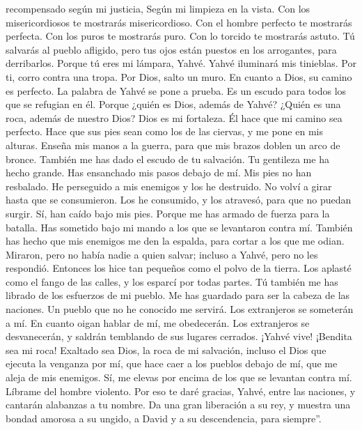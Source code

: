 recompensado según mi justicia, Según mi limpieza en la vista.
 Con los misericordiosos te mostrarás misericordioso. Con
el hombre perfecto te mostrarás perfecta.  Con los puros
te mostrarás puro. Con lo torcido te mostrarás astuto. 
Tú salvarás al pueblo afligido, pero tus ojos están puestos en los
arrogantes, para derribarlos.  Porque tú eres mi lámpara,
Yahvé. Yahvé iluminará mis tinieblas.  Por ti, corro
contra una tropa. Por Dios, salto un muro.  En cuanto a
Dios, su camino es perfecto. La palabra de Yahvé se pone a prueba. Es un
escudo para todos los que se refugian en él.  Porque
¿quién es Dios, además de Yahvé? ¿Quién es una roca, además de nuestro
Dios?  Dios es mi fortaleza. Él hace que mi camino sea
perfecto.  Hace que sus pies sean como los de las
ciervas, y me pone en mis alturas.  Enseña mis manos a la
guerra, para que mis brazos doblen un arco de bronce. 
También me has dado el escudo de tu salvación. Tu gentileza me ha hecho
grande.  Has ensanchado mis pasos debajo de mí. Mis pies
no han resbalado.  He perseguido a mis enemigos y los he
destruido. No volví a girar hasta que se consumieron. 
Los he consumido, y los atravesó, para que no puedan surgir. Sí, han
caído bajo mis pies.  Porque me has armado de fuerza para
la batalla. Has sometido bajo mi mando a los que se levantaron contra
mí.  También has hecho que mis enemigos me den la
espalda, para cortar a los que me odian.  Miraron, pero
no había nadie a quien salvar; incluso a Yahvé, pero no les respondió.
 Entonces los hice tan pequeños como el polvo de la
tierra. Los aplasté como el fango de las calles, y los esparcí por todas
partes.  Tú también me has librado de los esfuerzos de mi
pueblo. Me has guardado para ser la cabeza de las naciones. Un pueblo
que no he conocido me servirá.  Los extranjeros se
someterán a mí. En cuanto oigan hablar de mí, me obedecerán.
 Los extranjeros se desvanecerán, y saldrán temblando de
sus lugares cerrados.  ¡Yahvé vive! ¡Bendita sea mi roca!
Exaltado sea Dios, la roca de mi salvación,  incluso el
Dios que ejecuta la venganza por mí, que hace caer a los pueblos debajo
de mí,  que me aleja de mis enemigos. Sí, me elevas por
encima de los que se levantan contra mí. Líbrame del hombre violento.
 Por eso te daré gracias, Yahvé, entre las naciones, y
cantarán alabanzas a tu nombre.  Da una gran liberación a
su rey, y muestra una bondad amorosa a su ungido, a David y a su
descendencia, para siempre''.

